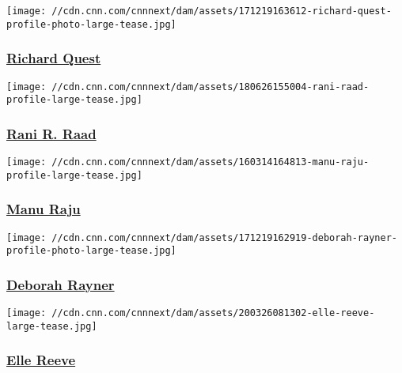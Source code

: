 \href{/profiles/richard-quest-profile}{}

\texttt{[image: //cdn.cnn.com/cnnnext/dam/assets/171219163612-richard-quest-profile-photo-large-tease.jpg]}

\hypertarget{richard-quest}{%
\subsubsection{\texorpdfstring{\href{/profiles/richard-quest-profile}{Richard
Quest}}{Richard Quest}}\label{richard-quest}}

\href{/profiles/rani-r-raad-profile}{}

\texttt{[image: //cdn.cnn.com/cnnnext/dam/assets/180626155004-rani-raad-profile-large-tease.jpg]}

\hypertarget{rani-r-raad}{%
\subsubsection{\texorpdfstring{\href{/profiles/rani-r-raad-profile}{Rani
R. Raad}}{Rani R. Raad}}\label{rani-r-raad}}

\href{/profiles/manu-raju}{}

\texttt{[image: //cdn.cnn.com/cnnnext/dam/assets/160314164813-manu-raju-profile-large-tease.jpg]}

\hypertarget{manu-raju}{%
\subsubsection{\texorpdfstring{\href{/profiles/manu-raju}{Manu
Raju}}{Manu Raju}}\label{manu-raju}}

\href{/profiles/deborah-rayner-profile}{}

\texttt{[image: //cdn.cnn.com/cnnnext/dam/assets/171219162919-deborah-rayner-profile-photo-large-tease.jpg]}

\hypertarget{deborah-rayner}{%
\subsubsection{\texorpdfstring{\href{/profiles/deborah-rayner-profile}{Deborah
Rayner}}{Deborah Rayner}}\label{deborah-rayner}}

\href{/profiles/elle-reeve-profile}{}

\texttt{[image: //cdn.cnn.com/cnnnext/dam/assets/200326081302-elle-reeve-large-tease.jpg]}

\hypertarget{elle-reeve}{%
\subsubsection{\texorpdfstring{\href{/profiles/elle-reeve-profile}{Elle
Reeve}}{Elle Reeve}}\label{elle-reeve}}

